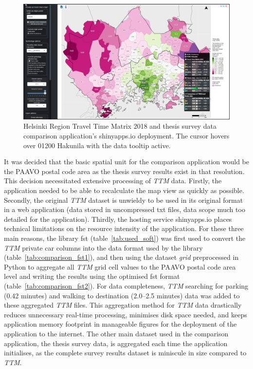 \begin{figure}[H]%
    \includegraphics[width=\textwidth]{images/shinyapps_comparison.png}
    \caption[Comparison application screenshot]{Helsinki Region Travel Time Matrix 2018 and thesis survey data comparison application's shinyapps.io deployment. The cursor hovers over 01200 Hakunila with the data tooltip active.}%
    \label{fig:shinyapps_comparison}%
\end{figure}

It was decided that the basic spatial unit for the comparison application would be the PAAVO postal code area as the thesis survey results exist in that resolution. This decision necessitated extensive processing of \textit{TTM} data. Firstly, the application needed to be able to recalculate the map view as quickly as possible. Secondly, the original \textit{TTM} dataset is unwieldy to be used in its original format in a web application (data stored in uncompressed txt files, data scope much too detailed for the application). Thirdly, the hosting service shinyapps.io places technical limitations on the resource intensity of the application. For these three main reasons, the library fst (table~\ref{tab:used_soft}) was first used to convert the \textit{TTM} private car columns into the data format used by the library (table~\ref{tab:comparison_fst1}), and then using the dataset \textit{grid} preprocessed in Python to aggregate all \textit{TTM} grid cell values to the PAAVO postal code area level and writing the results using the optimised fst format (table~\ref{tab:comparison_fst2}). For data completeness, \textit{TTM} searching for parking (0.42 minutes) and walking to destination (2.0--2.5 minutes) data was added to these aggregated \textit{TTM} files. This aggregation method for \textit{TTM} data drastically reduces unnecessary real-time processing, minimises disk space needed, and keeps application memory footprint in manageable figures for the deployment of the application to the internet. The other main dataset used in the comparison application, the thesis survey data, is aggregated each time the application initialises, as the complete survey results dataset is miniscule in size compared to \textit{TTM}.

